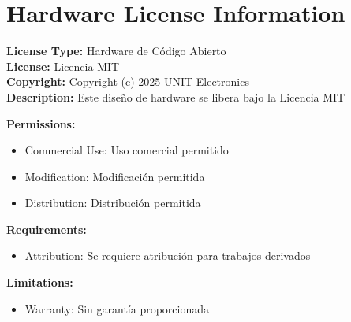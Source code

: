 \documentclass[11pt,a4paper]{article}
\begin{document}

\tableofcontents
\newpage



\listoffigures
\newpage



\listoftables
\newpage





\section*{Hardware License Information}

\begin{tcolorbox}[
    colback=green!5!white,
    colframe=green!50!black,
    title=Open Source Hardware License,
    fonttitle=\bfseries
]

\textbf{License Type:} Hardware de Código Abierto\\[0.2cm]
\textbf{License:} Licencia MIT\\[0.2cm]
\textbf{Copyright:} Copyright (c) 2025 UNIT Electronics\\[0.2cm]

\textbf{Description:} Este diseño de hardware se libera bajo la Licencia MIT

\vspace{0.3cm}
\textbf{Permissions:}
\begin{itemize}
    \item Commercial Use: Uso comercial permitido
    \item Modification: Modificación permitida
    \item Distribution: Distribución permitida
\end{itemize}

\textbf{Requirements:}
\begin{itemize}
    \item Attribution: Se requiere atribución para trabajos derivados
\end{itemize}

\textbf{Limitations:}
\begin{itemize}
    \item Warranty: Sin garantía proporcionada
\end{itemize}

\end{tcolorbox}
\newpage
\end{document}
